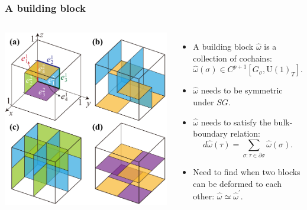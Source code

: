 \documentclass[xcolor=table, 10pt, aspectratio=43]{beamer}
\newcommand{\uone}{\mathrm U(1)}
\begin{document}
\begin{frame}
	\frametitle{A building block}
	\begin{columns}
		\begin{center}
			\includegraphics[width=\textwidth]{blocks}
		\end{center}
		\begin{itemize}
			\item A building block $\hat\omega$ is a collection of cochains:
			\[\hat\omega(\sigma) \in C^{p+1}[G_\sigma, \uone_T].\]
			\item $\hat\omega$ needs to be symmetric under $SG$.
			\item $\hat\omega$ needs to satisfy the bulk-boundary relation:
			\[d\hat\omega(\tau) = \sum_{\sigma:\tau\in\partial\sigma}\hat\omega(\sigma).\]
			\item Need to find when two blocks can be deformed to each other: $\hat\omega\simeq\hat\omega^\prime$.
		\end{itemize}
	\end{columns}
\end{frame}
\end{document}
